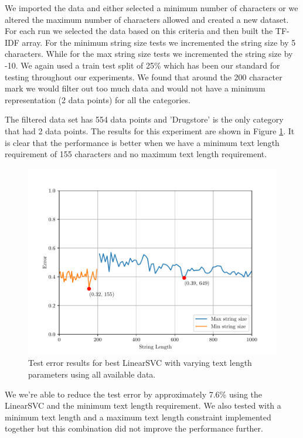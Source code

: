 We imported the data and either selected a minimum number of characters or we altered the maximum number of characters allowed and created a new dataset. For each run we selected the data based on this criteria and then built the TF-IDF array. For the minimum string size tests we incremented the string size by 5 characters. While for the max string size tests we incremented the string size by -10. We again used a train test split of 25\% which has been our standard for testing throughout our experiments. We found that around the 200 character mark we would filter out too much data and would not have a minimum representation (2 data points) for all the categories. 

The filtered data set has 554 data points and 'Drugstore' is the only category that had 2 data points. The results for this experiment are shown in Figure \ref{fig:grid_search_text_length}. It is clear that the performance is better when we have a minimum text length requirement of 155 characters and no maximum text length requirement. 

\begin{figure}[ht]
    \centering
    \includegraphics[width=\scale\textwidth]{../img/plot_data_length_grid_search.pdf}
    \caption{Test error results for best LinearSVC with varying text length parameters using all available data.}
    \label{fig:grid_search_text_length}
  \end{figure}

We we're able to reduce the test error by approximately 7.6\% using the LinearSVC and the minimum text length requirement. We also tested with a minimum text length and a maximum text length constraint implemented together but this combination did not improve the performance further.

